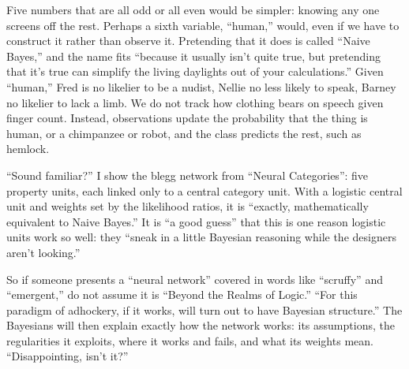 Five numbers that are all odd or all even would be simpler: knowing any one screens off the rest. Perhaps a sixth variable, ``human,'' would, even if we have to construct it rather than observe it. Pretending that it does is called ``Naive Bayes,'' and the name fits ``because it usually isn't quite true, but pretending that it's true can simplify the living daylights out of your calculations.'' Given ``human,'' Fred is no likelier to be a nudist, Nellie no less likely to speak, Barney no likelier to lack a limb. We do not track how clothing bears on speech given finger count. Instead, observations update the probability that the thing is human, or a chimpanzee or robot, and the class predicts the rest, such as hemlock. 

``Sound familiar?'' I show the blegg network from ``Neural Categories'': five property units, each linked only to a central category unit. With a logistic central unit and weights set by the likelihood ratios, it is ``exactly, mathematically equivalent to Naive Bayes.''  It is ``a good guess'' that this is one reason logistic units work so well: they ``sneak in a little Bayesian reasoning while the designers aren't looking.'' 

So if someone presents a ``neural network'' covered in words like ``scruffy'' and ``emergent,'' do not assume it is ``Beyond the Realms of Logic.'' ``For this paradigm of adhockery, if it works, will turn out to have Bayesian structure.''  The Bayesians will then explain exactly how the network works: its assumptions, the regularities it exploits, where it works and fails, and what its weights mean. ``Disappointing, isn't it?''
